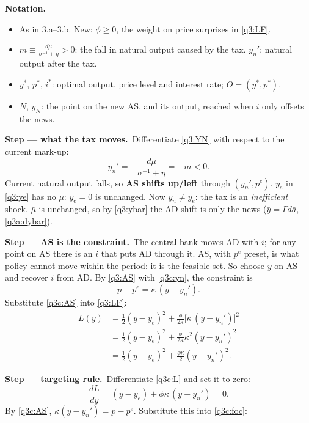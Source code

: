 \documentclass[11pt,a4paper]{article}
\newcommand{\passo}[2]{\par\smallskip\noindent\textbf{Step --- #1.}~#2}
\newenvironment{notacao}{\par\smallskip\noindent\textbf{Notation.}\begin{itemize}[leftmargin=1.4em,topsep=1pt,itemsep=0pt]\small}{\end{itemize}}
\begin{document}
\begin{sol}
\begin{notacao}
\item As in 3.a--3.b. New: $\phi\ge0$, the weight on price surprises in \eqref{q3:LF}.
\item $m\equiv\frac{d\mu}{\sigma^{-1}+\eta}>0$: the fall in natural output caused by the tax.
$y_n'$: natural output after the tax.
\item $y^\ast$, $p^\ast$, $i^\ast$: optimal output, price level and interest rate; $O=(y^\ast,p^\ast)$.
\item $N$, $y_N$: the point on the new AS, and its output, reached when $i$ only offsets the news.
\end{notacao}
\passo{what the tax moves}{Differentiate \eqref{q3:YN} with respect to the current mark-up:}
\begin{equation}
y_n'=-\frac{d\mu}{\sigma^{-1}+\eta}=-m<0. \label{q3c:yn}
\end{equation}
Current natural output falls, so \textbf{AS shifts up/left} through $(y_n',p^e)$. $y_e$ in
\eqref{q3:ye} has no $\mu$: $y_e=0$ is unchanged. Now $y_n\neq y_e$: the tax is an
\emph{inefficient} shock. $\bar\mu$ is unchanged, so by \eqref{q3:ybar} the AD shift is only the
news ($\bar y=\Gamma d\bar a$, \eqref{q3a:dybar}).
\passo{AS is the constraint}{The central bank moves AD with $i$; for any point on AS there is an
$i$ that puts AD through it. AS, with $p^e$ preset, is what policy cannot move within the period:
it is the feasible set. So choose $y$ on AS and recover $i$ from AD. By \eqref{q3:AS} with
\eqref{q3c:yn}, the constraint is}
\begin{equation}
p-p^e=\kappa\,(y-y_n'). \label{q3c:AS}
\end{equation}
Substitute \eqref{q3c:AS} into \eqref{q3:LF}:
\begin{align}
L(y) &= \tfrac12(y-y_e)^2+\tfrac{\phi}{2\kappa}\big[\kappa\,(y-y_n')\big]^2\nonumber\\
&= \tfrac12(y-y_e)^2+\tfrac{\phi}{2\kappa}\kappa^2(y-y_n')^2\nonumber\\
&= \tfrac12(y-y_e)^2+\tfrac{\phi\kappa}{2}(y-y_n')^2 . \label{q3c:L}
\end{align}
\passo{targeting rule}{Differentiate \eqref{q3c:L} and set it to zero:}
\begin{equation}
\frac{dL}{dy}=(y-y_e)+\phi\kappa\,(y-y_n')=0. \label{q3c:foc}
\end{equation}
By \eqref{q3c:AS}, $\kappa(y-y_n')=p-p^e$. Substitute this into \eqref{q3c:foc}:
\begin{equation}

\end{equation}
\end{sol}
\end{document}
